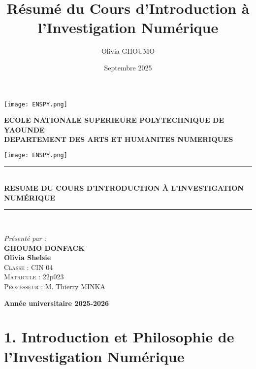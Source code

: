 \documentclass[12pt, a4paper]{report}
\title{\textbf{Résumé du Cours d’Introduction à l’Investigation Numérique}}
\author{Olivia GHOUMO}
\date{Septembre 2025}
\begin{document}
\begin{titlepage}
\begin{center}
    \begin{minipage}{0.2\textwidth}
        \centering
        \texttt{[image: ENSPY.png]}
    \end{minipage}\hfill
    \begin{minipage}{0.6\textwidth}
        \centering
        \textbf{ECOLE NATIONALE SUPERIEURE POLYTECHNIQUE DE YAOUNDE}\\[0.1cm]
        \textbf{DEPARTEMENT DES ARTS ET HUMANITES NUMERIQUES}\\[0.1cm]
    \end{minipage}\hfill
    \begin{minipage}{0.2\textwidth}
        \centering
        \texttt{[image: ENSPY.png]}
    \end{minipage}

    \vspace{2.5cm}
    \rule{\linewidth}{0.3mm} \\[0.4cm]
    {\huge \bfseries\color{blue} RESUME DU COURS D'INTRODUCTION À L'INVESTIGATION NUMÉRIQUE \\[0.4cm] }
    \rule{\linewidth}{0.3mm} \\[3cm]

    \noindent
    \begin{minipage}{0.4\textwidth}
        \begin{flushleft} \large
            \emph{Présenté par :}\\
            \textbf{GHOUMO DONFACK}\\
            \textbf{Olivia Shelsie}\\
            \textsc{Classe :} CIN 04\\
            \textsc{Matricule :} 22p023\\
            \textsc{Professeur :} M. Thierry MINKA
        \end{flushleft}
    \end{minipage}
    \vfill

    {\textbf{\large Année universitaire 2025-2026}}
\end{center}
\end{titlepage}

\newpage
\section*{1. Introduction et Philosophie de l’Investigation Numérique}
\end{document}
